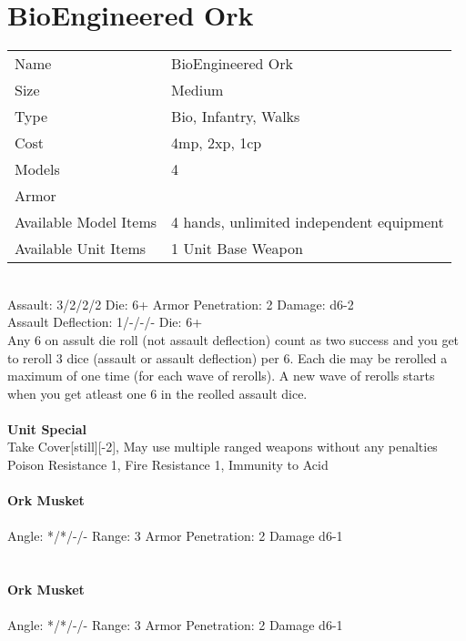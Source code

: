 






\pagebreak

\section{ BioEngineered Ork }

\begin{tabular}{ll}
  Name & BioEngineered Ork \\
  Size & Medium\\
  Type & Bio, Infantry, Walks\\
  Cost & 4mp, 2xp, 1cp\\
  Models & 4\\
  Armor & \\
  Available Model Items & 4 hands, unlimited independent equipment \\
  Available Unit Items & 1 Unit Base Weapon \\
\end{tabular}

\ \\
Assault: 3/2/2/2 Die: 6+ Armor Penetration: 2 Damage: d6-2 \\
Assault Deflection: 1/-/-/- Die: 6+\\
\indent Any 6 on assult die roll (not assault deflection) count as two success and you get to reroll 3 dice (assault or assault deflection) per 6. Each die may be rerolled a maximum of one time (for each wave of rerolls). A new wave of rerolls starts when you get atleast one 6 in the reolled assault dice. \\
\ \\

{\bf Unit Special} \\
Take Cover[still][-2], May use multiple ranged weapons without any penalties\\ Poison Resistance 1, Fire Resistance 1, Immunity to Acid
\ \\
\ \\
{\bf Ork Musket } \\
\ \\
Angle: */*/-/- Range: 3 Armor Penetration: 2 Damage d6-1 \\
\indent  \\



\ \\
{\bf Ork Musket } \\
\ \\
Angle: */*/-/- Range: 3 Armor Penetration: 2 Damage d6-1 \\
\indent  \\





